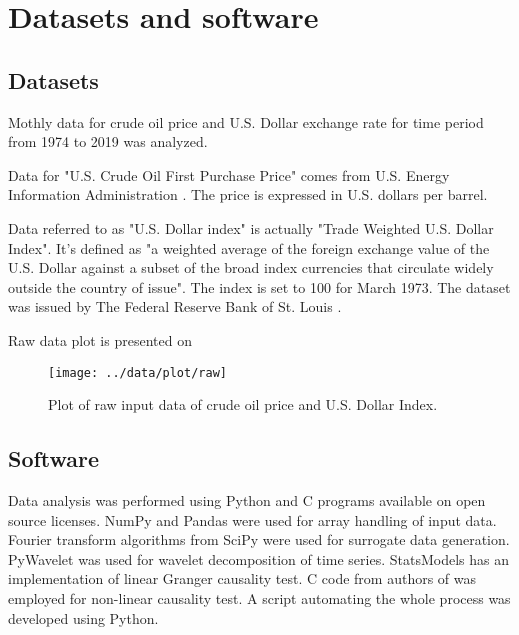 \section{Datasets and software} \label{sec:data}

\subsection{Datasets}

Mothly data for crude oil price and U.S. Dollar exchange rate for time period from 1974 to 2019 was analyzed.

Data for "U.S. Crude Oil First Purchase Price" comes from U.S. Energy Information Administration \cite{crude-oil-data}. The price is expressed in U.S. dollars per barrel.

Data referred to as "U.S. Dollar index" is actually "Trade Weighted U.S. Dollar Index".
It's defined as "a weighted average of the foreign exchange value of the U.S. Dollar against a subset of the broad index currencies that circulate widely outside the country of issue".
The index is set to 100 for March 1973.
The dataset was issued by The Federal Reserve Bank of St. Louis \cite{usd-data}.

Raw data plot is presented on 

\begin{figure}[h]
	\texttt{[image: ../data/plot/raw]}
	\caption{Plot of raw input data of crude oil price and U.S. Dollar Index.}
	\label{fig:raw-data}
\end{figure}


\subsection{Software}
Data analysis was performed using Python and C programs available on open source licenses.
NumPy \cite{numpy} and Pandas \cite{reback2020pandas} were used for array handling of input data.
Fourier transform algorithms from SciPy \cite{scipy} were used for surrogate data generation.
PyWavelet \cite{pywavelet} was used for wavelet decomposition of time series.
StatsModels \cite{statsmodels} has an implementation of linear Granger causality test.
C code from authors of \cite{diks-panchenko2004} was employed for non-linear causality test.
A script automating the whole process was developed using Python.
